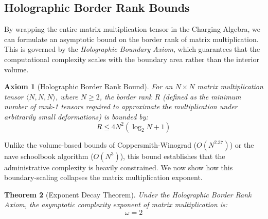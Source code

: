 \documentclass[11pt,a4paper]{book}
\newtheorem{theorem}{Theorem}
\newtheorem{axiom}[theorem]{Axiom}
\begin{document}
\subsection{Holographic Border Rank Bounds}
\label{sec:holographic_boundary}

By wrapping the entire matrix multiplication tensor in the Charging Algebra, we can formulate an asymptotic bound on the border rank of matrix multiplication. 
This is governed by the \textit{Holographic Boundary Axiom}, which guarantees that the computational complexity scales with the boundary area rather than the interior volume.

\begin{axiom}[Holographic Border Rank Bound]
\label{ax:holographic_bound}
For an $N \times N$ matrix multiplication tensor $\langle N, N, N \rangle$, where $N \ge 2$, the border rank $R$ (defined as the minimum number of rank-1 tensors required to approximate the multiplication under arbitrarily small deformations) is bounded by:
\begin{equation}
\label{eq:holographic_inequality}
R \le 4 N^2 \left( \log_2 N + 1 \right)
\end{equation}
\end{axiom}

Unlike the volume-based bounds of Coppersmith-Winograd ($O(N^{2.37})$) or the nave schoolbook algorithm ($O(N^3)$), this bound establishes that the administrative complexity is heavily constrained. 
We now show how this boundary-scaling collapses the matrix multiplication exponent.

\begin{theorem}[Exponent Decay Theorem]
\label{thm:omega_collapse}
Under the Holographic Border Rank Axiom, the asymptotic complexity exponent of matrix multiplication is:
\begin{equation}
\omega = 2
\end{equation}
\end{theorem}
\end{document}
